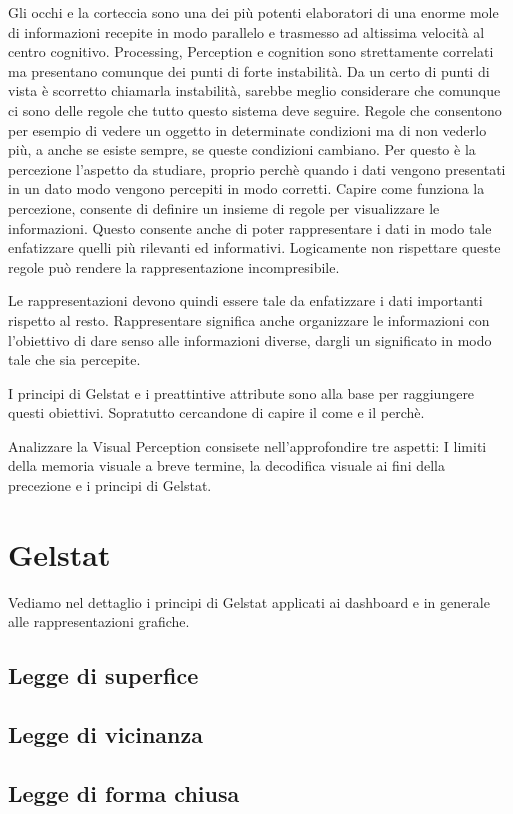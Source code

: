\documentclass{ium}
\begin{document}
Gli occhi e la corteccia sono una dei più potenti elaboratori di una enorme mole di informazioni recepite in modo parallelo e trasmesso ad altissima velocità al centro cognitivo. Processing, Perception e cognition sono strettamente correlati ma presentano comunque dei punti di forte instabilità. Da un certo di punti di vista è scorretto chiamarla instabilità, sarebbe meglio considerare che comunque ci sono delle regole che tutto questo sistema deve seguire. Regole che consentono per esempio di vedere un oggetto in determinate condizioni ma di non vederlo più, a anche se esiste sempre, se queste condizioni cambiano.
Per questo è la percezione l'aspetto da studiare, proprio perchè quando i dati vengono presentati in un dato modo vengono percepiti in modo corretti. Capire come  funziona la percezione, consente di definire un insieme di regole per visualizzare le informazioni. Questo consente anche di poter rappresentare i dati in modo tale enfatizzare quelli più rilevanti ed informativi.
Logicamente non rispettare queste regole può rendere la rappresentazione incompresibile.

Le rappresentazioni devono quindi essere tale da enfatizzare i dati importanti rispetto al resto. Rappresentare significa anche organizzare le informazioni con l'obiettivo di dare senso alle informazioni diverse, dargli un significato in modo tale che sia percepite.

I principi di Gelstat e i preattintive attribute sono alla base per raggiungere questi obiettivi. Sopratutto cercandone di capire il come e il perchè.

Analizzare la Visual Perception consisete nell'approfondire tre aspetti: I limiti della memoria visuale a breve termine, la decodifica visuale ai fini della precezione e i principi di Gelstat.


\section{Gelstat}
Vediamo nel dettaglio i principi di Gelstat applicati ai dashboard e in generale alle rappresentazioni grafiche.
\subsection{Legge di superfice}
\subsection{Legge di vicinanza}
\subsection{Legge di forma chiusa}
\end{document}
